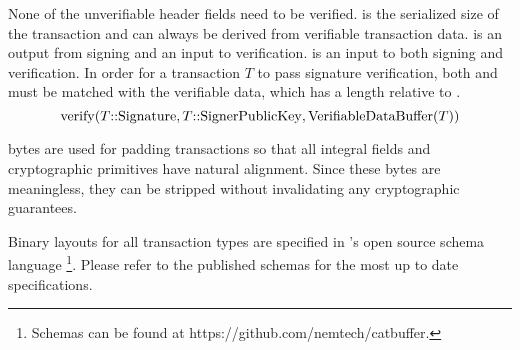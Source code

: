 None of the unverifiable header fields need to be verified.
 is the serialized size of the transaction and can always be derived from verifiable transaction data.
 is an output from signing and an input to verification.
 is an input to both signing and verification.
In order for a transaction $T$ to pass signature verification, both  and  must be matched with the verifiable data, which has a length relative to .
$$\mathrm{verify}(T\mathrm{{::}Signature}, T\mathrm{{::}SignerPublicKey}, \mathrm{VerifiableDataBuffer}(T))$$

 bytes are used for padding transactions so that all integral fields and cryptographic primitives have natural alignment.
Since these bytes are meaningless, they can be stripped without invalidating any cryptographic guarantees.

Binary layouts for all transaction types are specified in \codename's open source schema language
\footnote{Schemas can be found at https://github.com/nemtech/catbuffer.}.
Please refer to the published schemas for the most up to date specifications.

\begin{figure}[H]
\end{figure}

